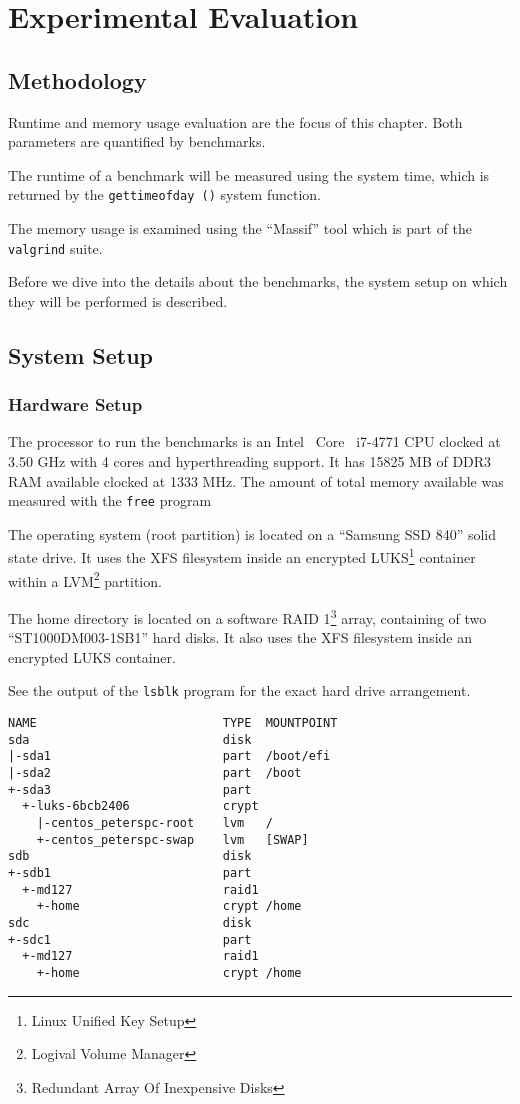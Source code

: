 \chapter{Experimental Evaluation}

\section{Methodology}

Runtime and memory usage evaluation are the focus of this chapter.
Both parameters are quantified by benchmarks.

The runtime of a benchmark will be measured using the system time, which is returned by the \texttt{gettimeofday ()} system function.

The memory usage is examined using the ``Massif'' tool which is part of the \texttt{valgrind} suite.\cite{valgrind}

Before we dive into the details about the benchmarks, the system setup on which they will be performed is described.

\section{System Setup}
  \subsection{Hardware Setup}

The processor to run the benchmarks is an Intel\textregistered~ Core\texttrademark~ i7-4771 CPU clocked at 3.50 GHz with 4 cores and hyperthreading support.
It has 15825 MB of DDR3 RAM available clocked at 1333 MHz.
The amount of total memory available was measured with the \texttt{free} program

The operating system (root partition) is located on a ``Samsung SSD 840'' solid state drive.
It uses the XFS filesystem inside an encrypted LUKS\footnote{Linux Unified Key Setup} container within a LVM\footnote{Logival Volume Manager} partition.

The home directory is located on a software RAID 1\footnote{Redundant Array Of Inexpensive Disks} array, containing of two ``ST1000DM003-1SB1'' hard disks.
It also uses the XFS filesystem inside an encrypted LUKS container.

See the output of the \texttt{lsblk} program for the exact hard drive arrangement.

\begin{lstlisting}[caption={Disk arrangement on the benchmark machine}]
NAME                          TYPE  MOUNTPOINT
sda                           disk
|-sda1                        part  /boot/efi
|-sda2                        part  /boot
+-sda3                        part
  +-luks-6bcb2406             crypt
    |-centos_peterspc-root    lvm   /
    +-centos_peterspc-swap    lvm   [SWAP]
sdb                           disk
+-sdb1                        part
  +-md127                     raid1
    +-home                    crypt /home
sdc                           disk
+-sdc1                        part
  +-md127                     raid1
    +-home                    crypt /home
\end{lstlisting}

